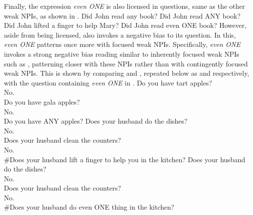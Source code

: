 Finally, the expression \textit{even \MakeUppercase{one}} is also licensed in questions, same as the other weak NPIs, as shown in .
\pex\label{ex:even-question}
\a Did John read any book?
\a Did John read \MakeUppercase{any} book?
\a Did John lifted a finger to help Mary?
\a Did John read even \MakeUppercase{one} book?
\xe
However, aside from being licensed,  also invokes a negative bias to its question. In this, \textit{even \MakeUppercase{one}} patterns once more with focused weak NPIs. Specifically, \textit{even \MakeUppercase{one}} invokes a strong negative bias reading similar to inherently focused weak NPIs such as , patterning closer with these NPIs rather than with contingently focused weak NPIs. This is shown by comparing  and , repeated below as  and  respectively, with the question containing \textit{even \MakeUppercase{one}} in .
\ex\label{ex:even-fruitstand}
Do you have tart apples?\\
No.\\
Do you have gala apples?\\
No.\\
Do you have ANY apples?\hfill\parencites{Jeong2021}[p.~4]{Jeong2022}
\xe
\ex\label{ex:even-badminimiserQ}
\phantom{\#}Does your husband do the dishes?\\
\phantom{\#}No.\\
\phantom{\#}Does your husband clean the counters?\\
\phantom{\#}No.\\
\#Does your husband lift a finger to help you in the kitchen?
\xe
\ex\label{ex:even-badoneQ}
\phantom{\#}Does your husband do the dishes?\\
\phantom{\#}No.\\
\phantom{\#}Does your husband clean the counters?\\
\phantom{\#}No.\\
\#Does your husband do even \MakeUppercase{one} thing in the kitchen?
\xe

